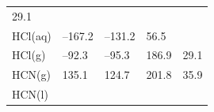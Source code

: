 \documentclass[
]{book}
\theoremstyle{definition}
\theoremstyle{definition}
\theoremstyle{definition}
\theoremstyle{remark}
\begin{document}
\begin{longtable}[]{@{}lllll@{}}
\begin{minipage}[t]{0.18\columnwidth}
29.1\strut
\end{minipage}\tabularnewline
\begin{minipage}[t]{0.10\columnwidth}\raggedright
HCl(aq)\strut
\end{minipage} & \begin{minipage}[t]{0.19\columnwidth}\raggedright
--167.2\strut
\end{minipage} & \begin{minipage}[t]{0.20\columnwidth}\raggedright
--131.2\strut
\end{minipage} & \begin{minipage}[t]{0.18\columnwidth}\raggedright
56.5\strut
\end{minipage} & \begin{minipage}[t]{0.18\columnwidth}\raggedright
\strut
\end{minipage}\tabularnewline
\begin{minipage}[t]{0.10\columnwidth}\raggedright
HCl(g)\strut
\end{minipage} & \begin{minipage}[t]{0.19\columnwidth}\raggedright
--92.3\strut
\end{minipage} & \begin{minipage}[t]{0.20\columnwidth}\raggedright
--95.3\strut
\end{minipage} & \begin{minipage}[t]{0.18\columnwidth}\raggedright
186.9\strut
\end{minipage} & \begin{minipage}[t]{0.18\columnwidth}\raggedright
29.1\strut
\end{minipage}\tabularnewline
\begin{minipage}[t]{0.10\columnwidth}\raggedright
HCN(g)\strut
\end{minipage} & \begin{minipage}[t]{0.19\columnwidth}\raggedright
135.1\strut
\end{minipage} & \begin{minipage}[t]{0.20\columnwidth}\raggedright
124.7\strut
\end{minipage} & \begin{minipage}[t]{0.18\columnwidth}\raggedright
201.8\strut
\end{minipage} & \begin{minipage}[t]{0.18\columnwidth}\raggedright
35.9\strut
\end{minipage}\tabularnewline
\begin{minipage}[t]{0.10\columnwidth}\raggedright
HCN(l)\strut

\end{minipage}
\end{longtable}
\end{document}
